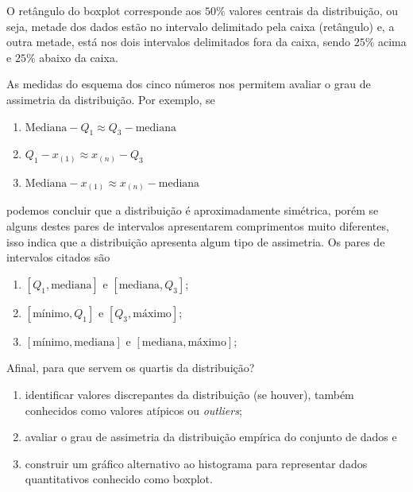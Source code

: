 O retângulo do boxplot corresponde aos $50\%$ valores centrais da distribuição, ou seja, metade dos dados estão no intervalo delimitado pela caixa (retângulo) e, a outra metade, está nos dois intervalos delimitados fora da caixa, sendo $25\%$ acima e $25\%$ abaixo da caixa.

As medidas do esquema dos cinco números nos permitem avaliar o grau de assimetria da distribuição. Por exemplo, se

\begin{enumerate}
\item $\text{Mediana}-Q_1\approx Q_3-\text{mediana}$
\item $Q_1-x_{(1)}\approx x_{(n)}-Q_3$
\item $\text{Mediana}-x_{(1)}\approx x_{(n)}-\text{mediana}$
\end{enumerate}
podemos concluir que a distribuição é aproximadamente simétrica, porém se alguns destes pares de intervalos apresentarem comprimentos muito diferentes, isso indica que a distribuição apresenta algum tipo de assimetria. Os pares de intervalos citados são

\begin{enumerate}
\item $[Q_1, \text{mediana}] \text{ e } [\text{mediana}, Q_3]$;
\item $[\text{mínimo}, Q_1] \text{ e } [Q_3, \text{máximo}]$;
\item $[\text{mínimo}, \text{mediana}] \text{ e } [\text{mediana},\text{máximo}]$;
\end{enumerate}

Afinal, para que servem os quartis da distribuição?
\begin{enumerate}
\item identificar valores discrepantes da distribuição (se houver), também conhecidos como valores atípicos ou \textit{outliers};
\item avaliar o grau de assimetria da distribuição empírica do conjunto de dados e
\item construir um gráfico alternativo ao histograma para representar dados quantitativos conhecido como boxplot.
\end{enumerate}

